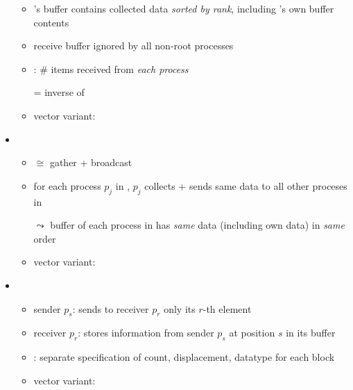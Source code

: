 \begin{itemize}
  \begin{itemize}
    \item {}'s buffer contains collected data \emph{sorted by rank}, including 's own buffer contents
    \item receive buffer ignored by all non-root processes
    \item {}: \# items received from \emph{each process}
    \item[=] inverse of 
    \item vector variant: 
  \end{itemize}
  \item {}
  \begin{itemize}
    \item \( \cong \) gather + broadcast
    \item for each process \( p_j \) in , \( p_j \) collects + sends same data to all other proceses in 
    \item[\( \leadsto \)] buffer of each process in  has \emph{same} data (including own data) in \emph{same} order
    \item vector variant: 
  \end{itemize}
  \item {}
  \begin{itemize}
    \item sender \( p_s \): sends to receiver \( p_r \) only its \( r \)-th element
    \item receiver \( p_r \): stores information from sender \( p_s \) at position \( s \) in its buffer
    \item {}: separate specification of count, displacement, datatype for each block
    \item vector variant: 
  \end{itemize}
\end{itemize}

